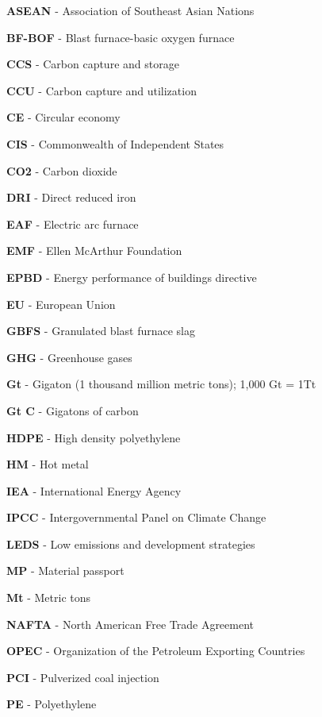\begin{scriptsize}
  \begin{myitemize}
  \item[] \textbf{ASEAN} - Association of Southeast Asian Nations
  \item[] \textbf{BF-BOF} - Blast furnace-basic oxygen furnace
  \item[] \textbf{CCS} - Carbon capture and storage
  \item[] \textbf{CCU} - Carbon capture and utilization
  \item[] \textbf{CE} - Circular economy
  \item[] \textbf{CIS} - Commonwealth of Independent States
  \item[] \textbf{CO2} - Carbon dioxide
  \item[] \textbf{DRI} - Direct reduced iron
  \item[] \textbf{EAF} - Electric arc furnace
  \item[] \textbf{EMF} - Ellen McArthur Foundation
  \item[] \textbf{EPBD} - Energy performance of buildings directive
  \item[] \textbf{EU} - European Union
  \item[] \textbf{GBFS} - Granulated blast furnace slag
  \item[] \textbf{GHG} - Greenhouse gases
  \item[] \textbf{Gt} - Gigaton (1 thousand million metric tons); 1,000 Gt = 1Tt
  \item[] \textbf{Gt C} - Gigatons of carbon
  \item[] \textbf{HDPE} - High density polyethylene
  \item[] \textbf{HM} - Hot metal
  \item[] \textbf{IEA} - International Energy Agency
  \item[] \textbf{IPCC} - Intergovernmental Panel on Climate Change
  \item[] \textbf{LEDS} - Low emissions and development strategies
  \item[] \textbf{MP} - Material passport
  \item[] \textbf{Mt} - Metric tons
  \item[] \textbf{NAFTA} - North American Free Trade Agreement
  \item[] \textbf{OPEC} - Organization of the Petroleum Exporting Countries
  \item[] \textbf{PCI} - Pulverized coal injection
  \item[] \textbf{PE} - Polyethylene

\end{myitemize}
\end{scriptsize}

